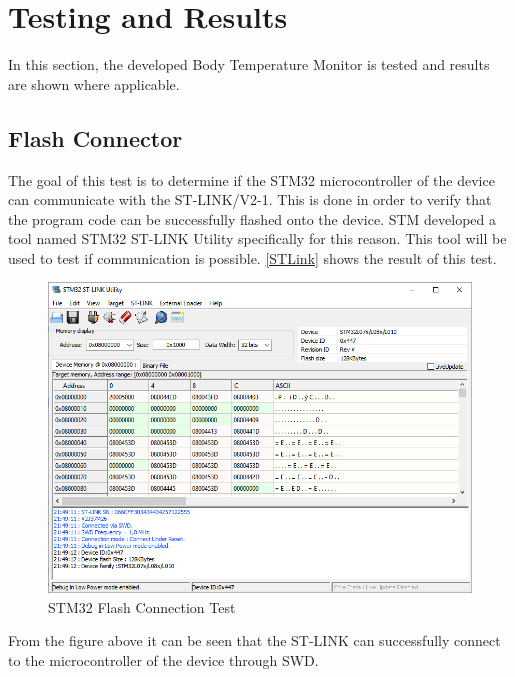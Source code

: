 \section{Testing and Results}
In this section, the developed Body Temperature Monitor is tested and results are shown where applicable. 

\subsection{Flash Connector}
The goal of this test is to determine if the STM32 microcontroller of the device can communicate with the ST-LINK/V2-1. This is done in order to verify that the program code can be successfully flashed onto the device. STM developed a tool named STM32 ST-LINK Utility specifically for this reason. This tool will be used to test if communication is possible. \autoref{STLink} shows the result of this test. 
\begin{figure}[H]
	\centering
	\includegraphics[scale=0.7]{img/STLink.png}
	\caption{STM32 Flash Connection Test}
	\label{STLink}
\end{figure}
\noindent
From the figure above it can be seen that the ST-LINK can successfully connect to the microcontroller of the device through SWD. 

